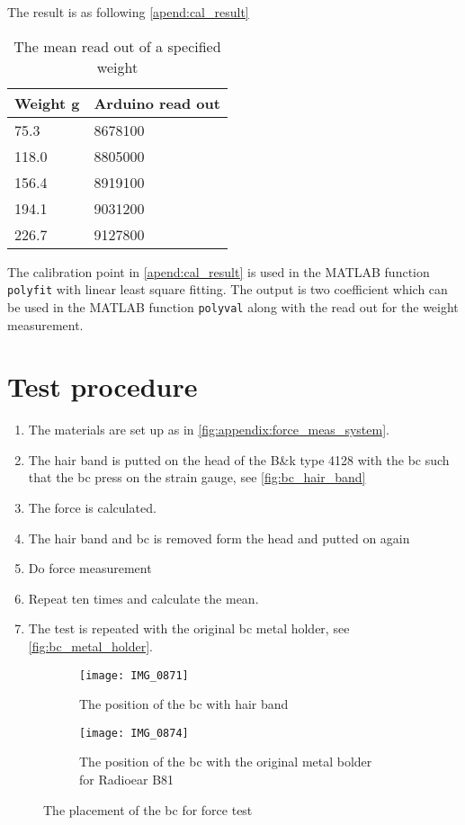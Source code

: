 The result is as following \autoref{apend:cal_result}

\begin{table}[H]
\centering
\caption{The mean read out of a specified weight}
\label{apend:cal_result}
\begin{tabular}{l|l}
Weight \si{\gram} & Arduino read out \\ \hline
75.3              & 8678100          \\
118.0             & 8805000          \\
156.4             & 8919100          \\
194.1             & 9031200          \\
226.7             & 9127800         
\end{tabular}
\end{table}

The calibration point in \autoref{apend:cal_result} is used in the MATLAB function \texttt{polyfit} with linear least square fitting. The output is two coefficient which can be used in the MATLAB function \texttt{polyval} along with the read out for the weight measurement. 


\section*{Test procedure}


\begin{enumerate}
\item The materials are set up as in \autoref{fig:appendix:force_meas_system}.
\item The hair band is putted on the head of the B\&k type 4128 with the \gls{bc} such that the \gls{bc} press on the strain gauge, see \autoref{fig:bc_hair_band}
\item The force is calculated.
\item The hair band and \gls{bc} is removed form the head and putted on again
\item Do force measurement
\item  Repeat ten times and calculate the mean.
\item  The test is repeated with the original \gls{bc} metal holder, see \autoref{fig:bc_metal_holder}.
\end{enumerate}



\begin{figure}[H]
\centering
\begin{subfigure}[htbp]{0.33\textwidth}
		\texttt{[image: IMG\_0871]}
		\caption{The position of the \gls{bc} with hair band}
		\label{fig:bc_hair_band}
\end{subfigure}\vspace{10pt}
\begin{subfigure}[htbp]{0.60\textwidth}
		\texttt{[image: IMG\_0874]}
		\caption{The position of the \gls{bc} with the original metal bolder for Radioear B81}
		\label{fig:bc_metal_holder}
\end{subfigure} \hspace{10pt}
\caption{The placement of the \gls{bc} for force test}
\label{fig:bc_holder}
\end{figure}


